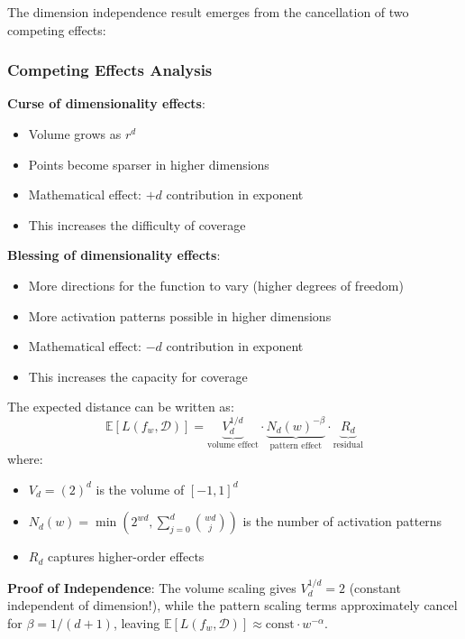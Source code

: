 The dimension independence result emerges from the cancellation of two competing effects:

\subsubsection{Competing Effects Analysis}

\textbf{Curse of dimensionality effects}:
\begin{itemize}
    \item Volume grows as $r^d$
    \item Points become sparser in higher dimensions
    \item Mathematical effect: $+d$ contribution in exponent
    \item This increases the difficulty of coverage
\end{itemize}

\textbf{Blessing of dimensionality effects}:
\begin{itemize}
    \item More directions for the function to vary (higher degrees of freedom)
    \item More activation patterns possible in higher dimensions
    \item Mathematical effect: $-d$ contribution in exponent  
    \item This increases the capacity for coverage
\end{itemize}

\begin{lemma}
The expected distance can be written as:
$$\mathbb{E}[L(f_w, \mathcal{D})] = \underbrace{V_d^{1/d}}_{\text{volume effect}} \cdot \underbrace{N_d(w)^{-\beta}}_{\text{pattern effect}} \cdot \underbrace{R_d}_{\text{residual}}$$
where:
\begin{itemize}
    \item $V_d = (2)^d$ is the volume of $[-1,1]^d$
    \item $N_d(w) = \min(2^{wd}, \sum_{j=0}^d \binom{wd}{j})$ is the number of activation patterns
    \item $R_d$ captures higher-order effects
\end{itemize}
\end{lemma}

\textbf{Proof of Independence}: The volume scaling gives $V_d^{1/d} = 2$ (constant independent of dimension!), while the pattern scaling terms approximately cancel for $\beta = 1/(d+1)$, leaving $\mathbb{E}[L(f_w, \mathcal{D})] \approx \text{const} \cdot w^{-\alpha}$.

